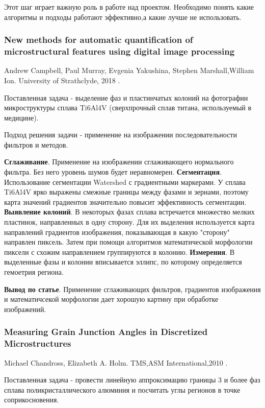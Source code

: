 \documentclass[a4paper, 14pt]{article}
\begin{document}
	Этот шаг играет важную роль в работе над проектом. Необходимо понять какие алгоритмы и подходы работают эффективно,а какие лучше не использовать.
	
	\subsubsection{New methods for automatic quantification of microstructural features using digital image processing}
	Andrew Campbell, Paul Murray, Evgenia Yakushina, Stephen Marshall,William Ion. University of Strathclyde, 2018 \cite{dav_abstract_1}.
	
	Поставленная задача - выделение фаз и  пластинчатых колоний на фотографии микроструктуры сплава  Ti6Al4V (сверхпрочный сплав титана, используемый в медицине).
	
	Подход решения задачи - применение на изображении последовательности фильтров и методов. 
	
	\textbf{Сглаживание}. Применение на изображении сглаживающего нормального фильтра. Без него уровень шумов будет неравномерен.
	\textbf{Сегментация}. Использование сегментации Watershed с градиентными маркерами. У сплава  Ti6Al4V ярко выражены смежные границы между фазами и зернами, поэтому карта значений градиентов значительно повысит эффективность сегментации.
	\textbf{Выявление колоний}. В некоторых фазах сплава встречается множество мелких пластинок, направленных в одну сторону. Для их выделения используется карта направлений градиентов изображения, показывающая в какую "сторону" направлен пиксель. Затем при помощи алгоритмов математической морфологии пиксели с схожим направлением группируются в колонию.
	\textbf{Измерения}. В выделенные фазы и колонии вписывается эллипс, по которому определяется гемоетрия региона.
	
	\textbf{Вывод по статье}. Применение сглаживающих фильтров, градиентов изображения и математичсекой морфологии дает хорошую картину при обработке изображений. 
	
	\subsubsection{Measuring Grain Junction Angles in Discretized Microstructures} 
	Michael Chandross, Elizabeth A. Holm. TMS,ASM International,2010 \cite{dav_abstract_2}.
	
	Поставленная задача - провести линейную аппроксимацию границы 3 и более фаз сплава поликристаллического алюминия и посчитать углы регионов в точке соприкосновения.
	
\end{document}
